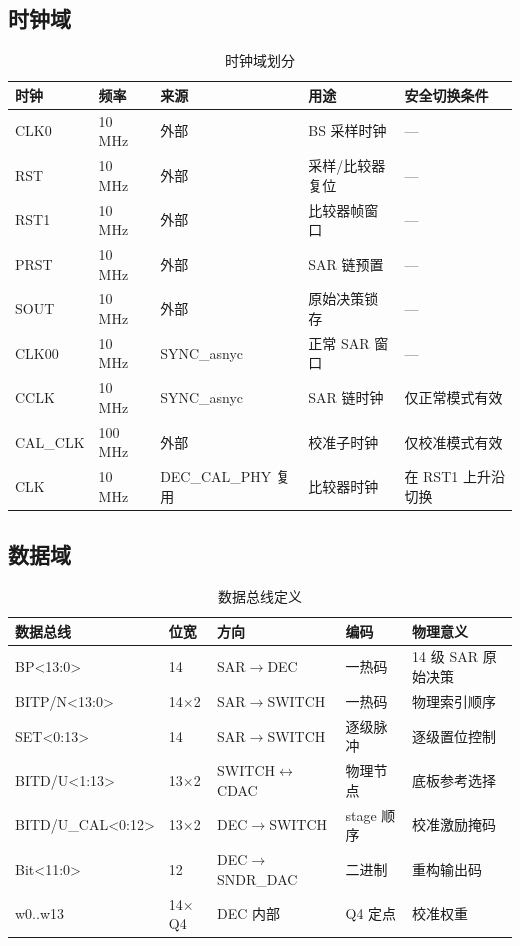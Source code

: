 \documentclass[UTF8,a4paper,11pt]{ctexart}
\begin{document}
\subsection{时钟域}

\begin{table}[H]
\centering
\caption{时钟域划分}
\label{tab:clock-domain}
\small
\begin{tabular}{lllll}
\toprule
时钟 & 频率 & 来源 & 用途 & 安全切换条件 \\
\midrule
CLK0    & 10 MHz  & 外部          & BS 采样时钟        & --- \\
RST     & 10 MHz  & 外部          & 采样/比较器复位    & --- \\
RST1    & 10 MHz  & 外部          & 比较器帧窗口       & --- \\
PRST    & 10 MHz  & 外部          & SAR 链预置         & --- \\
SOUT    & 10 MHz  & 外部          & 原始决策锁存       & --- \\
CLK00   & 10 MHz  & SYNC\_asnyc  & 正常 SAR 窗口      & --- \\
CCLK    & 10 MHz  & SYNC\_asnyc  & SAR 链时钟         & 仅正常模式有效 \\
CAL\_CLK & 100 MHz & 外部         & 校准子时钟         & 仅校准模式有效 \\
CLK     & 10 MHz  & DEC\_CAL\_PHY 复用 & 比较器时钟 & 在 RST1 上升沿切换 \\
\bottomrule
\end{tabular}
\end{table}

\subsection{数据域}

\begin{table}[H]
\centering
\caption{数据总线定义}
\label{tab:data-domain}
\small
\begin{tabular}{lllll}
\toprule
数据总线 & 位宽 & 方向 & 编码 & 物理意义 \\
\midrule
BP<13:0>          & 14   & SAR$\rightarrow$DEC   & 一热码     & 14 级 SAR 原始决策 \\
BITP/N<13:0>      & 14$\times$2 & SAR$\rightarrow$SWITCH & 一热码 & 物理索引顺序 \\
SET<0:13>         & 14   & SAR$\rightarrow$SWITCH & 逐级脉冲 & 逐级置位控制 \\
BITD/U<1:13>      & 13$\times$2 & SWITCH$\leftrightarrow$CDAC & 物理节点 & 底板参考选择 \\
BITD/U\_CAL<0:12> & 13$\times$2 & DEC$\rightarrow$SWITCH & stage 顺序 & 校准激励掩码 \\
Bit<11:0>         & 12   & DEC$\rightarrow$SNDR\_DAC & 二进制 & 重构输出码 \\
w0..w13           & 14$\times$Q4 & DEC 内部 & Q4 定点 & 校准权重 \\
\bottomrule
\end{tabular}
\end{table}
\end{document}
